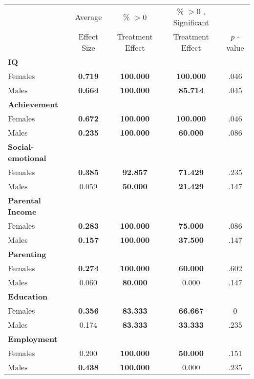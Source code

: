 \begin{tabular}{l c c c c}
\toprule
 & Average & \% $ >0 $ & \% $ >0 $ , Significant & \citet{Rosenbaum_2005_Distribution_JRSS} \\
 & Effect Size & Treatment Effect & Treatment Effect & $ p $ -value \\
\midrule
\textbf{IQ} & & & & \\
\quad Females &  \textbf{    0.719} & \textbf{  100.000} & \textbf{  100.000} & .046 \\
\quad Males &  \textbf{    0.664} & \textbf{  100.000} & \textbf{   85.714} & .045 \\
\midrule
\textbf{Achievement} & & & & \\
\quad Females &  \textbf{    0.672} & \textbf{  100.000} & \textbf{  100.000} & .046 \\
\quad Males &  \textbf{    0.235} & \textbf{  100.000} & \textbf{   60.000} & .086 \\
\midrule
\textbf{Social-emotional} & & & & \\
\quad Females &  \textbf{    0.385} & \textbf{   92.857} & \textbf{   71.429} & .235 \\
\quad Males &      0.059 & \textbf{   50.000} & \textbf{   21.429} & .147 \\
\midrule
\textbf{Parental Income} & & & & \\
\quad Females &  \textbf{    0.283} & \textbf{  100.000} & \textbf{   75.000} & .086 \\
\quad Males &  \textbf{    0.157} & \textbf{  100.000} & \textbf{   37.500} & .147 \\
\midrule
\textbf{Parenting} & & & & \\
\quad Females &  \textbf{    0.274} & \textbf{  100.000} & \textbf{   60.000} & .602 \\
\quad Males &      0.060 & \textbf{   80.000} &     0.000 & .147 \\
\midrule
\textbf{Education} & & & & \\
\quad Females &  \textbf{    0.356} & \textbf{   83.333} & \textbf{   66.667} & 0 \\
\quad Males &      0.174 & \textbf{   83.333} & \textbf{   33.333} & .235 \\
\midrule
\textbf{Employment} & & & & \\
\quad Females &      0.200 & \textbf{  100.000} & \textbf{   50.000} & .151 \\
\quad Males &  \textbf{    0.438} & \textbf{  100.000} &     0.000 & .235 \\

\end{tabular}
